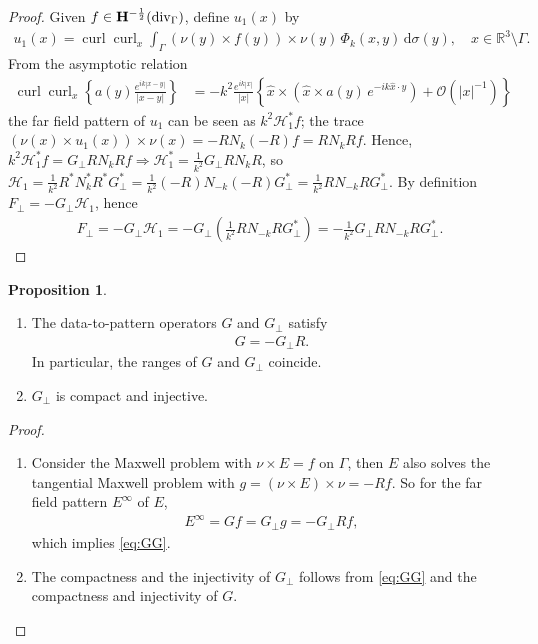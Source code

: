 \documentclass[a4paper,12pt]{article}
\theoremstyle{definition}
\newtheorem{prp}{Proposition}
\newcommand\bdr{\Gamma}
\newcommand\Div{\divv_\bdr}
\newcommand\Hhm{{\bf H}^{-\frac{1}{2}}}
\newcommand\lTD{\Hhm(\Div)}
\newcommand\ints[2][y]{\int_{\bdr}#2\,\text{d}\sigma(#1)}
\DeclareMathOperator\curl{curl}
\DeclareMathOperator\divv{div}
\begin{document}
\begin{proof}
  Given $f\in\lTD$, define $u_1(x)$ by
  \begin{align*}
    u_1(x) = \curl\curl_x\ints{\left(\nu(y)\times f(y)\right)\times\nu(y)\,\Phi_k(x,y)},\quad x\in\mathbb{R}^3\setminus\bdr.
  \end{align*}
  From the asymptotic relation
  \begin{align*}
    \curl\curl_x\left\{a(y)\frac{e^{ik|x-y|}}{|x-y|}\right\} &= -k^2\frac{e^{ik|x|}}{|x|}\left\{\hat{x}\times\left(\hat{x}\times a(y)\,e^{-ik\hat{x}\cdot y}\right)+ \mathcal{O}\left(|x|^{-1}\right)\right\} 
  \end{align*}
  the far field pattern of $u_1$ can be seen as $k^2\mathcal{H}_1^*f$; the trace $\left(\nu(x)\times u_1(x)\right)\times\nu(x) = -R N_k (-R) f = R N_k R f$. Hence, $k^2\mathcal{H}_1^*f = G_\perp R N_k R f\Longrightarrow\mathcal{H}_1^* = \frac{1}{k^2} G_\perp R N_k R$, so $\mathcal{H}_1 = \frac{1}{k^2} R^* N_k^* R^* G_\perp^* = \frac{1}{k^2} (-R) N_{-k} (-R) G_\perp^* = \frac{1}{k^2} R N_{-k} R G_\perp^*$. By definition $F_\perp=-G_\perp\mathcal{H}_1$, hence 
  \begin{align}
    F_\perp = -G_\perp\mathcal{H}_1 = -G_\perp\left(\frac{1}{k^2}R N_{-k} R G_\perp^*\right)= -\frac{1}{k^2}G_\perp R N_{-k} R G_\perp^*.
  \end{align}
\end{proof}

\begin{prp}
  \begin{enumerate}
    \item The data-to-pattern operators $G$ and $G_\perp$ satisfy
      \begin{align}\label{eq:GG}
        G = -G_\perp R.
      \end{align}
      In particular, the ranges of $G$ and $G_\perp$ coincide.
    \item $G_\perp$ is compact and injective. 
  \end{enumerate}
\end{prp}

\begin{proof}
  \begin{enumerate}
    \item Consider the Maxwell problem with $\nu\times E=f$ on $\bdr$, then $E$ also solves the tangential Maxwell problem with $g=(\nu\times E)\times\nu=-Rf$. So for the far field pattern $E^\infty$ of $E$, 
      \begin{align}
        E^\infty = Gf = G_\perp g = -G_\perp Rf,
      \end{align}
      which implies \eqref{eq:GG}.
    \item The compactness and the injectivity of $G_\perp$ follows from \eqref{eq:GG} and the compactness and injectivity of $G$.
  \end{enumerate}
\end{proof}
\end{document}
